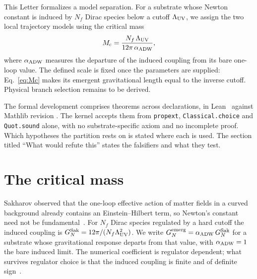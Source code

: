 \documentclass[aps,prl,reprint,nofootinbib,superscriptaddress]{revtex4-2}
\newcommand{\Mc}{M_{\rm c}}
\newcommand{\aADW}{\alpha_{\rm ADW}}
\newcommand{\Ladw}{\Lambda_{\rm UV}}
\newcommand{\Nf}{N_f}
\newcommand{\GNem}{G_N^{\rm emerg}}
\begin{document}
This Letter formalizes a model separation. For a substrate whose Newton
constant is induced by $\Nf$ Dirac species below a cutoff $\Ladw$, we
assign the two local trajectory models using the critical mass
\begin{equation}
  \Mc = \frac{\Nf\,\Ladw}{12\pi\,\aADW},
  \label{eq:Mc}
\end{equation}
where $\aADW$ measures the departure of the induced coupling from its bare
one-loop value. The defined scale is fixed once the parameters are supplied:
Eq.~\eqref{eq:Mc} makes its emergent gravitational length equal to
the inverse cutoff. Physical branch selection remains to be derived.

The formal development comprises \bundleTheorems{} theorems across
\bundleDecls{} declarations, in Lean~\leantoolchain{} against Mathlib
revision \mathlibrev{}. The kernel accepts them from \texttt{propext},
\texttt{Classical.choice} and \texttt{Quot.sound} alone, with no
substrate-specific axiom and no incomplete proof. Which hypotheses the
partition rests on is stated where each is used. The section titled
``What would refute this'' states the falsifiers and what they test.

\section{The critical mass}
\label{sec:Mc}

Sakharov observed that the one-loop effective action of matter fields in a
curved background already contains an Einstein--Hilbert term, so Newton's
constant need not be fundamental~\cite{Sakharov1968,Adler1982}. For $\Nf$
Dirac species regulated by a hard cutoff the induced coupling is
$G_N^{\rm Sak} = 12\pi/(\Nf\Ladw^{2})$. We write
$\GNem = \aADW\,G_N^{\rm Sak}$ for a substrate whose gravitational response
departs from that value, with $\aADW = 1$ the bare induced limit. The
numerical coefficient is regulator dependent; what survives regulator
choice is that the induced coupling is finite and of definite
sign~\cite{Visser2002}.
\end{document}
